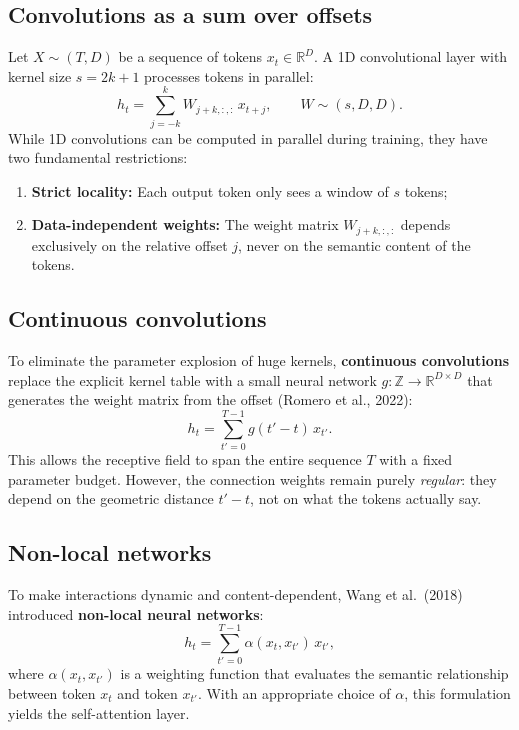 \documentclass[11pt,a4paper]{article}
\newcommand{\R}{\mathbb{R}}
\newcommand{\slides}[1]{\par\nopagebreak\noindent{\normalfont\small\emph{(slides #1)}}\par\nopagebreak\vspace{2pt}}
\theoremstyle{definition}
\theoremstyle{plain}
\begin{document}
\subsection{Convolutions as a sum over offsets}\slides{23 / 84}
Let $X \sim (T, D)$ be a sequence of tokens $x_t \in \R^D$. A 1D convolutional layer with kernel size $s = 2k+1$ processes tokens in parallel:
\begin{equation}\label{eq:conv1d}
h_t = \sum_{j=-k}^k W_{j+k,:,:} \, x_{t+j}, \qquad W \sim (s, D, D).
\end{equation}
While 1D convolutions can be computed in parallel during training, they have two fundamental restrictions:
\begin{enumerate}[nosep]
\item \textbf{Strict locality:} Each output token only sees a window of $s$ tokens;
\item \textbf{Data-independent weights:} The weight matrix $W_{j+k,:,:}$ depends exclusively on the relative offset $j$, never on the semantic content of the tokens.
\end{enumerate}

\subsection{Continuous convolutions}\slides{24 / 84}
To eliminate the parameter explosion of huge kernels, \textbf{continuous convolutions} replace the explicit kernel table with a small neural network $g: \mathbb{Z} \to \R^{D \times D}$ that generates the weight matrix from the offset (Romero et al., 2022):
\begin{equation}
h_t = \sum_{t'=0}^{T-1} g(t' - t) \, x_{t'}.
\end{equation}
This allows the receptive field to span the entire sequence $T$ with a fixed parameter budget. However, the connection weights remain purely \emph{regular}: they depend on the geometric distance $t'-t$, not on what the tokens actually say.

\subsection{Non-local networks}\slides{25 / 84}
To make interactions dynamic and content-dependent, Wang et al.\ (2018) introduced \textbf{non-local neural networks}:
\begin{equation}\label{eq:nonlocal_def}
h_t = \sum_{t'=0}^{T-1} \alpha(x_t, x_{t'}) \, x_{t'},
\end{equation}
where $\alpha(x_t, x_{t'})$ is a weighting function that evaluates the semantic relationship between token $x_t$ and token $x_{t'}$. With an appropriate choice of $\alpha$, this formulation yields the self-attention layer.
\end{document}
